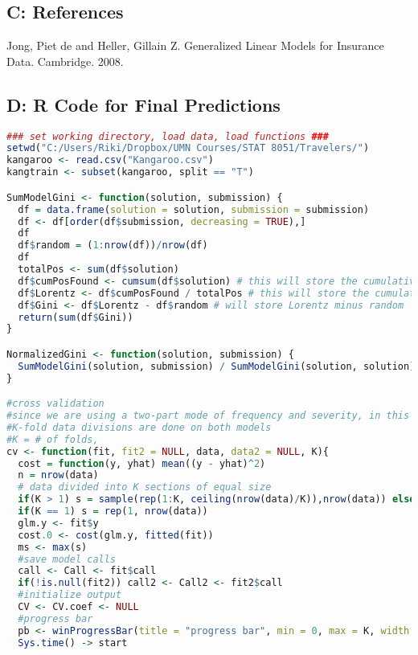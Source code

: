 \documentclass[a4paper]{article}\usepackage[]{graphicx}\usepackage[]{color}
\begin{document}
\subsection*{C: References}

Jong, Piet de and Heller, Gillain Z. Generalized Linear Models for Insurance Data. Cambridge. 2008.

\subsection*{D: R Code for Final Predictions} 

\begin{lstlisting}[language=R]
### set working directory, load data, load functions ###
setwd("C:/Users/Riki/Dropbox/UMN Courses/STAT 8051/Travelers/")
kangaroo <- read.csv("Kangaroo.csv")
kangtrain <- subset(kangaroo, split == "T")

SumModelGini <- function(solution, submission) {
  df = data.frame(solution = solution, submission = submission)
  df <- df[order(df$submission, decreasing = TRUE),]
  df
  df$random = (1:nrow(df))/nrow(df)
  df
  totalPos <- sum(df$solution)
  df$cumPosFound <- cumsum(df$solution) # this will store the cumulative number of positive examples found (used for computing "Model Lorentz")
  df$Lorentz <- df$cumPosFound / totalPos # this will store the cumulative proportion of positive examples found ("Model Lorentz")
  df$Gini <- df$Lorentz - df$random # will store Lorentz minus random
  return(sum(df$Gini))
}

NormalizedGini <- function(solution, submission) {
  SumModelGini(solution, submission) / SumModelGini(solution, solution)
}

#cross validation
#since we are using a two-part mode of frequency and severity, in this cv function we specify both models and
#K-fold data divisions are done on both models
#K = # of folds, 
cv <- function(fit, fit2 = NULL, data, data2 = NULL, K){
  cost = function(y, yhat) mean((y - yhat)^2)
  n = nrow(data)
  # data divided into K sections of equal size
  if(K > 1) s = sample(rep(1:K, ceiling(nrow(data)/K)),nrow(data)) else 
  if(K == 1) s = rep(1, nrow(data))
  glm.y <- fit$y
  cost.0 <- cost(glm.y, fitted(fit))
  ms <- max(s)
  #save model calls
  call <- Call <- fit$call
  if(!is.null(fit2)) call2 <- Call2 <- fit2$call
  #initialize output
  CV <- CV.coef <- NULL
  #progress bar
  pb <- winProgressBar(title = "progress bar", min = 0, max = K, width = 300)
  Sys.time() -> start
  

\end{lstlisting}
\end{document}
